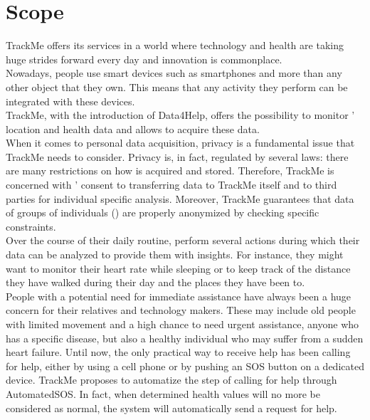 \documentclass[../../rasd.tex]{subfiles}
\begin{document}
\section{Scope\label{sect:1.2}}
TrackMe offers its services in a world where technology and health are taking huge strides forward every day and innovation is commonplace.\\
Nowadays, people use smart devices such as smartphones and  more than any other object that they own. This means that any activity they perform can be integrated with these devices.\\
TrackMe, with the introduction of Data4Help, offers the possibility to monitor ’ location and health data and allows  to acquire these data.\\

When it comes to personal data acquisition, privacy is a fundamental issue that TrackMe needs to consider. Privacy is, in fact, regulated by several laws: there are many restrictions on how  is acquired and stored. Therefore, TrackMe is concerned with ’ consent to transferring data to TrackMe itself and to third parties for individual specific analysis. Moreover, TrackMe guarantees that data of groups of individuals () are properly anonymized by checking specific constraints.\\

Over the course of their daily routine,  perform several actions during which their data can be analyzed to provide them with insights. For instance, they might want to monitor their heart rate while sleeping or to keep track of the distance they have walked during their day and the places they have been to.\\

People with a potential need for immediate assistance have always been a huge concern for their relatives and technology makers. These may include old people with limited movement and a high chance to need urgent assistance, anyone who has a specific disease, but also a healthy individual who may suffer from a sudden heart failure. Until now, the only practical way to receive help has been calling for help, either by using a cell phone or by pushing an SOS button on a dedicated device. TrackMe proposes to automatize the step of calling for help through AutomatedSOS. In fact, when determined health values will no more be considered as normal, the system will automatically send a request for help.\\
\end{document}
